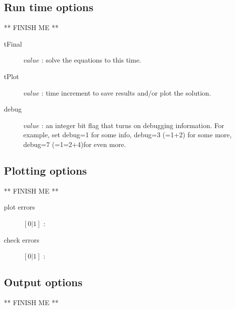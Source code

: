 \documentclass[11pt]{article}
\begin{document}
\subsection{Run time options}

** FINISH ME **

\begin{description}
  \item [\qquad tFinal] $value$ : solve the equations to this time.
  \item [\qquad tPlot] $value$ : time increment to save results and/or plot the solution.
  \item [\qquad debug] $value$ : an integer bit flag that turns on debugging information. For example, set debug=1 for some info, debug=3 (=1+2) for some
    more, debug=7 (=1=2+4)for even more. 
\end{description}

\subsection{Plotting options}

** FINISH ME **

\begin{description}
  \item [\qquad plot errors] $[0|1]$ :
  \item [\qquad check errors] $[0|1]$ :
\end{description}

\subsection{Output options}

** FINISH ME **
\end{document}
